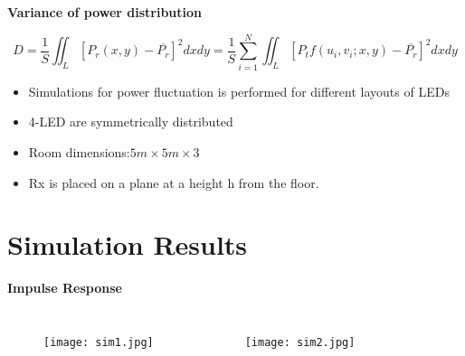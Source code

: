 \documentclass[9pt, dvipsnames]{beamer} %
\begin{document}
   \begin{frame}{\textbf {Variance of power distribution}}  
             
             \begin{equation}
                    D=\frac{1}{S}\iint_L[P_r(x,y)-\overline{P_r}]^2dxdy=\frac{1}{S}\sum_{i=1}^{N}\iint_L[P_tf(u_i,v_i;x,y)-\overline{P_r}]^2dxdy
              \end{equation}
              \begin{itemize}
                  \item Simulations for power fluctuation is performed for different layouts of LEDs
                  \item 4-LED are symmetrically distributed
                  \item Room dimensions:$5m\times 5m\times 3$
                  \item Rx is placed on a plane at a height h from the floor.
              \end{itemize}
              
                
    \end{frame}
    
\section{Simulation Results}
 
   \begin{frame}{\textbf {Impulse Response}}
           \begin{columns}
             \begin{figure}
               \texttt{[image: sim1.jpg]}
             \end{figure}      
             \begin{figure}
               \texttt{[image: sim2.jpg]}
             \end{figure}  
          \end{columns}  
          
   \end{frame}
   
\end{document}
